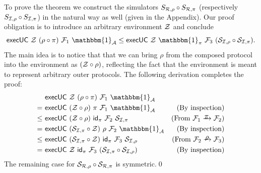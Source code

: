 \noindent \proof To prove the theorem we construct the simulators $S_{\mathcal{{R}},\rho} \circ S_{\mathcal{{R}},\pi}$ (respectively $S_{\mathcal{{I}},\rho} \circ S_{\mathcal{{I,\pi}}}$) in the natural way as well (given in the Appendix).
Our proof obligation is to introduce an arbitrary environment $\mathcal{{Z}}$ and conclude
\[  \keyword{execUC}~\mc{Z} ~(\rho \circ \pi)~\mc{F}_1 ~\mathbbm{1}_\mc{A}
\le \keyword{execUC}~\mc{Z} ~\mathbbm{1}_\mc{\pi} ~\mc{F}_3 ~(\mc{S}_{\mc{I},\rho} \circ \mc{S}_{\mc{I},\pi})
.\]
\noindent
%
The main idea is to notice that that we can bring $\rho$ from the composed protocol into the environment as $(\mathcal{{Z}}\circ \rho)$, reflecting the fact that the environment is meant to represent arbitrary outer protocols. The following derivation completes the proof:
\begin{align*}
    &~ \keyword{execUC}~\mc{Z}~(\rho \circ \pi)~\mc{F}_1~ \mathbbm{1}_\mc{A} & \\
  = &~ \keyword{execUC}~(\mc{Z}\circ \rho)~\pi~\mc{F}_1~ \mathbbm{1}_\mc{A} &
  \textnormal{(By inspection)} \\
\le&~ \keyword{execUC}~(\mc{Z}\circ \rho)~\mathsf{id}_\pi ~\mc{F}_2~ \mc{S}_{\mc{I},\pi} & (\textnormal{From}~ \mc{F}_1 \yrightarrow{$\pi$} \mc{F}_2) \\
 = &~ \keyword{execUC}~(\mc{S}_{\mc{I},\pi}\circ \mc{Z})~\rho ~\mc{F}_2~ \mathbbm{1}_\mc{A} &  \textnormal{(By inspection)} \\
\le&~ \keyword{execUC}~(\mc{S}_{\mc{I},\pi}\circ\mc{Z})~\mathsf{id}_\pi~\mc{F}_3~\mc{S}_{\mc{I},\rho} &
(\textnormal{From}~ \mc{F}_2 \yrightarrow{$\rho$} \mc{F}_3) \\
= &~ \keyword{execUC}~\mc{Z}~ \mathsf{id}_\pi~ \mc{F}_3~ (\mc{S}_{\mc{I},\pi} \circ \mc{S}_{\mc{I},\rho}) &
\textnormal{(By inspection)}
\end{align*}
The remaining case for $\mathcal{{S}}_{\mathcal{{R}},\rho} \circ \mathcal{{S}}_{\mathcal{{R}},\pi}$ is symmetric.\qed
